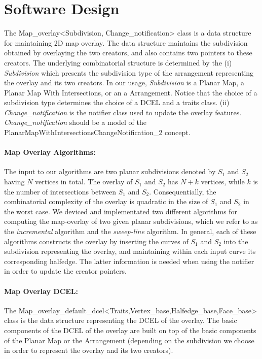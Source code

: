 \section{Software Design}
The {\ccc Map_overlay<Subdivision, Change_notification>} class 
is a data structure for maintaining 2D map overlay.
The data structure maintains the subdivision obtained by overlaying 
the two creators,
and also contains two pointers to these creators. 
The underlying combinatorial structure is determined by the
(i) {\it Subdivision} which presents the subdivision type of the arrangement 
representing the overlay and its two creators. 
In our usage, {\it Subdivision} is a {\ccc Planar Map}, 
a {\ccc Planar Map With Intersections}, or an a {\ccc Arrangement}.
Notice that the choice of a subdivision type determines the choice 
of a DCEL and a traits class.
(ii) {\it Change_notification} is the notifier class used to update the overlay features. 
{\it Change_notification} should be a model of the 
{\ccc PlanarMapWithIntersectionsChangeNotification_2} concept.

\paragraph{Map Overlay Algorithms:}
The input to our algorithms are two planar subdivisions denoted by $S_1$ and $S_2$ having 
$N$ vertices in total. The overlay of $S_1$ and $S_2$ has $N+k$ vertices, 
while $k$ is the number of intersections between 
$S_1$ and $S_2$. 
Consequentially, the combinatorial complexity of the overlay is quadratic 
in the size of $S_1$ and $S_2$ in the worst case.
We deviced and implementated two different algorithms for computing the map-overlay 
of two given planar subdivisions, 
which we refer to as the {\it incremental} algorithm and the {\it sweep-line} algorithm. 
In general, each of these algorithms constructs the overlay by inserting 
the curves of $S_1$ and $S_2$ into the subdivision representing the overlay,
and maintaining within each input curve its corresponding halfedge. 
The latter information is needed when using the notifier in order to
update the creator pointers. 

\paragraph{Map Overlay DCEL:}
The {\ccc Map_overlay_default_dcel<Traits,Vertex_base,Halfedge_base,Face_base>}
class is the data structure representing the DCEL of the overlay. 
The basic components of the DCEL of the overlay are built 
on top of the basic components of the {\ccc Planar Map} or the {\ccc Arrangement} 
(depending on the subdivision we choose in order to represent the overlay and its 
two creators).

